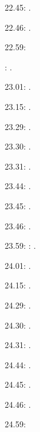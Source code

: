 \documentclass[italian]{article}
\begin{document}
22.45:     .

22.46:     .

22.59:     

:    .

23.01:     . 

23.15:     . 

23.29:     . 

23.30:     .

23.31:     .

23.44:     .

23.45:     .

23.46:     .

23.59:     
:    .

24.01:     . 

24.15:     . 

24.29:     . 

24.30:     .

24.31:     .

24.44:     .

24.45:     .

24.46:     .

24.59:     
\end{document}
